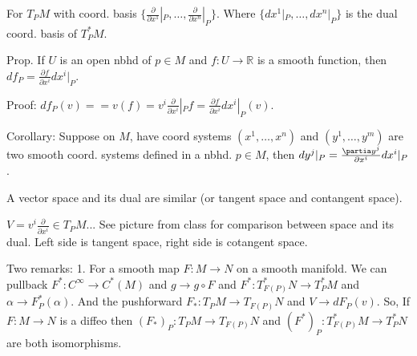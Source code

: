 \documentclass[12pt,letterpaper]{article}
\begin{document}
For $T_PM$ with coord. basis $\{ \frac{\partial }{\partial x^1}|_P, \dots, \frac{\partial}{\partial x^n}|_P\}$. Where $\{ dx^1|_P, \dots, dx^n |_P \}$ is the dual coord. basis of $T_P^*M$.

Prop. If $U$ is an open nbhd of $p \in M$ and $f: U \rightarrow \mathbb{R}$ is a smooth function, then $df_P = \frac{\partial f}{\partial x^i }dx^i|_P$.

Proof: $df_P(v) = =v(f) = v^i \frac{\partial }{\partial x^i}|_P f = \frac{\partial f}{\partial x^i}dx^i|_P (v)$.

Corollary: Suppose on $M$, have coord systems $(x^1, \dots, x^n)$ and $(y^1, \dots, y^m)$ are two smooth coord. systems defined in a nbhd. $p \in M$, then $dy^j|_P = \frac{\partia y^j}{\partial x^i}dx^i |_P$.

A vector space and its dual are similar (or tangent space and contangent space). 

$V = v^i \frac{\partial }{\partial x^i} \in T_P M$... See picture from class for comparison between space and its dual. Left side is tangent space, right side is cotangent space. 
 
Two  remarks: 1. For a smooth map $F: M \rightarrow N$ on a smooth manifold. We can pullback $F^*: C^{\infty} \rightarrow C^* (M)$ and $g \rightarrow g\circ F$ and $F^*: T^*_{F(P)} N \rightarrow T_P^* M$ and $\alpha \rightarrow F_P^* (\alpha)$. And the pushforward $F_*: T_PM \rightarrow T_{F(P)} N$ and $V \rightarrow dF_P (v)$. So, If $F:M \rightarrow N$ is a diffeo then $(F_*)_P : T_PM \rightarrow T_{F(P)} N$ and $(F^*)_P : T^*_{F(P)}M \rightarrow T^*_P N$ are both isomorphisms. 
 
\end{document}
